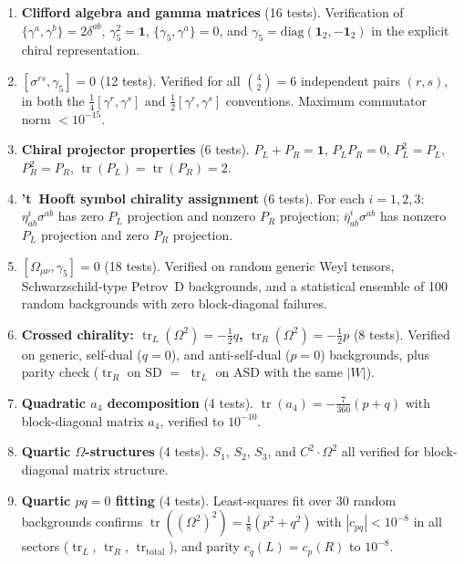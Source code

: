 \documentclass[12pt,a4paper]{article}
\theoremstyle{definition}
\theoremstyle{remark}
\newcommand{\tr}{\operatorname{tr}}
\begin{document}
\begin{enumerate}[(1)]
  \item \textbf{Clifford algebra and gamma matrices} (16 tests).
    Verification of $\{\gamma^a, \gamma^b\} = 2\delta^{ab}$,
    $\gamma_5^2 = \mathbf{1}$, $\{\gamma_5, \gamma^a\} = 0$, and
    $\gamma_5 = \mathrm{diag}(\mathbf{1}_2, -\mathbf{1}_2)$ in the
    explicit chiral representation.

  \item \textbf{$[\sigma^{rs}, \gamma_5] = 0$} (12 tests).
    Verified for all $\binom{4}{2} = 6$ independent pairs $(r, s)$,
    in both the $\frac{1}{4}[\gamma^r, \gamma^s]$ and
    $\frac{1}{2}[\gamma^r, \gamma^s]$ conventions.  Maximum commutator
    norm $< 10^{-15}$.

  \item \textbf{Chiral projector properties} (6 tests).
    $P_L + P_R = \mathbf{1}$, $P_L P_R = 0$, $P_L^2 = P_L$,
    $P_R^2 = P_R$, $\tr(P_L) = \tr(P_R) = 2$.

  \item \textbf{'t~Hooft symbol chirality assignment} (6 tests).
    For each $i = 1,2,3$: $\eta^i_{ab}\sigma^{ab}$ has zero $P_L$
    projection and nonzero $P_R$ projection;
    $\bar\eta^i_{ab}\sigma^{ab}$ has nonzero $P_L$ projection and zero
    $P_R$ projection.

  \item \textbf{$[\Omega_{\mu\nu}, \gamma_5] = 0$} (18 tests).
    Verified on random generic Weyl tensors, Schwarzschild-type Petrov~D
    backgrounds, and a statistical ensemble of 100 random backgrounds
    with zero block-diagonal failures.

  \item \textbf{Crossed chirality: $\tr_L(\Omega^2) = -\frac{1}{2}q$,
    $\tr_R(\Omega^2) = -\frac{1}{2}p$} (8 tests).
    Verified on generic, self-dual ($q = 0$), and anti-self-dual ($p = 0$)
    backgrounds, plus parity check ($\tr_R$ on SD $=$ $\tr_L$ on ASD
    with the same $|W|$).

  \item \textbf{Quadratic $a_4$ decomposition} (4 tests).
    $\tr(a_4) = -\frac{7}{360}(p + q)$ with block-diagonal matrix
    $a_4$, verified to $10^{-10}$.

  \item \textbf{Quartic $\Omega$-structures} (4 tests).
    $S_1$, $S_2$, $S_3$, and $C^2 \cdot \Omega^2$ all verified
    for block-diagonal matrix structure.

  \item \textbf{Quartic $pq = 0$ fitting} (4 tests).
    Least-squares fit over 30 random backgrounds confirms
    $\tr((\Omega^2)^2) = \frac{1}{8}(p^2 + q^2)$ with $|c_{pq}| < 10^{-8}$
    in all sectors ($\tr_L$, $\tr_R$, $\tr_{\mathrm{total}}$), and
    parity $c_q(L) = c_p(R)$ to $10^{-8}$.


\end{enumerate}
\end{document}
